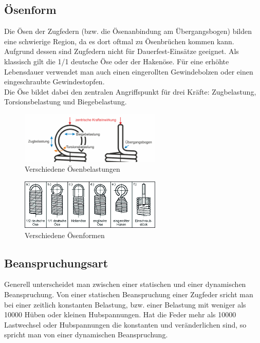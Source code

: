 \subsection{Ösenform}
Die Ösen der Zugfedern (bzw. die Ösenanbindung am Übergangsbogen) bilden eine schwierige Region, da es dort oftmal zu Ösenbrüchen
kommen kann. Aufgrund dessen sind Zugfedern nicht für Dauerfest-Einsätze geeignet.
Als klassisch gilt die 1/1 deutsche Öse oder der Hakenöse.
Für eine erhöhte Lebensdauer verwendet man auch einen eingerollten Gewindebolzen 
oder einen eingeschraubte Gewindestopfen.\\
Die Öse bildet dabei den zentralen Angriffspunkt für drei Kräfte: Zugbelastung, Torsionsbelastung und Biegebelastung.
\begin{figure}[H]
    \centering
    \includegraphics[width=0.6\textwidth]{bilder/Input/Oesenbelastung.jpg}
    \caption{Verschiedene Ösenbelastungen \cite{KompZ}}
\end{figure}
\begin{figure}[H]
    \centering
    \includegraphics[width=0.6\textwidth]{bilder/Input/Oesenformen.jpg}
    \caption{Verschiedene Ösenformen \cite{AusM2}}
\end{figure}


\subsection{Beanspruchungsart}
Generell unterscheidet man zwischen einer statischen und einer dynamischen Beanspruchung.
Von einer statischen Beanspruchung einer Zugfeder sricht man bei einer zeitlich
konstanten Belastung, bzw. einer Belastung mit weniger als 10000 Hüben oder 
kleinen Hubspannungen.
Hat die Feder mehr als 10000 Lastwechsel oder Hubspannungen die konstanten und veränderlichen sind,
so spricht man von einer dynamischen Beanspruchung.
\newpage


